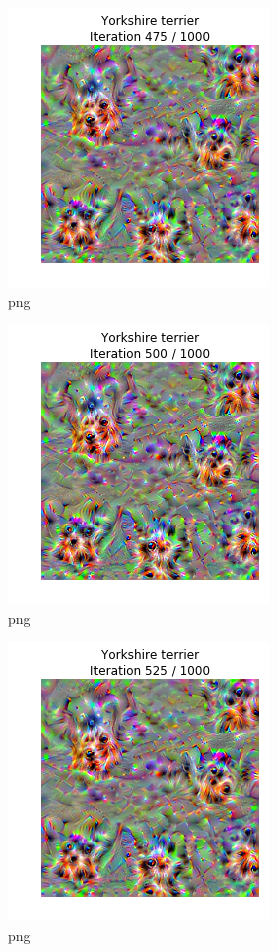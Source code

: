 \documentclass[]{book}
\theoremstyle{definition}
\theoremstyle{definition}
\theoremstyle{definition}
\theoremstyle{remark}
\begin{document}
\begin{figure}
\centering
\includegraphics{Network-Visualization-TensorFlow_files/Network-Visualization-TensorFlow_24_20.png}
\caption{png}
\end{figure}

\begin{figure}
\centering
\includegraphics{Network-Visualization-TensorFlow_files/Network-Visualization-TensorFlow_24_21.png}
\caption{png}
\end{figure}

\begin{figure}
\centering
\includegraphics{Network-Visualization-TensorFlow_files/Network-Visualization-TensorFlow_24_22.png}
\caption{png}
\end{figure}
\end{document}
